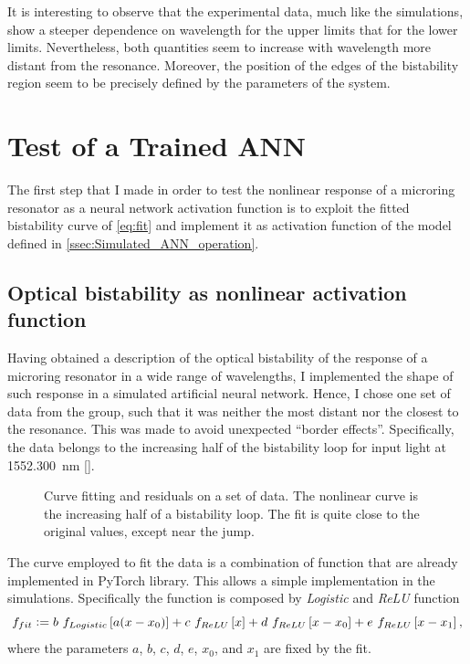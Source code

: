 It is interesting to observe that the experimental data, much like the simulations, show a steeper dependence on wavelength for the upper limits that for the lower limits.
Nevertheless, both quantities seem to increase with wavelength more distant from the resonance.
Moreover, the position of the edges of the bistability region seem to be precisely defined by the parameters of the system.

\section{Test of a Trained ANN}
\label{sec:Test_of_a_Trained ANN}
The first step that I made in order to test the nonlinear response of a microring resonator as a neural network activation function is to exploit the fitted bistability curve of \autoref{eq:fit} and implement it as activation function of the model defined in \autoref{ssec:Simulated_ANN_operation}.

\subsection{Optical bistability as nonlinear activation function}
\label{ssec:Optical_bistability_as_nonlinear_activation_function}
Having obtained a description of the optical bistability of the response of a microring resonator in a wide range of wavelengths, I implemented the shape of such response in a simulated artificial neural network.
Hence, I chose one set of data from the group, such that it was neither the most distant nor the closest to the resonance.
This was made to avoid unexpected ``border effects''.
Specifically, the data belongs to the increasing half of the bistability loop for input light at \SI{1552.300}{\nm} \ref{}.

\begin{figure}[htbp]
	\centering
	
	\caption{Curve fitting and residuals on a set of data.
	The nonlinear curve is the increasing half of a bistability loop.
	The fit is quite close to the original values, except near the jump.}
	\label{fig:fit+residuals}
\end{figure}

The curve employed to fit the data is a combination of function that are already implemented in PyTorch library.
This allows a simple implementation in the simulations.
Specifically the function is composed by \textit{Logistic} and \textit{ReLU} function
\begin{equation}
	f_{fit} \vcentcolon= b~f_{Logistic}\left[a(x-x_0)\right] + c~f_{ReLU}\left[x\right]+d~f_{ReLU}\left[x-x_0\right]+e~f_{ReLU}\left[x-x_1\right],
	\label{eq:fit}
\end{equation}
where the parameters $a$, $b$, $c$, $d$, $e$, $x_0$, and $x_1$ are fixed by the fit.

